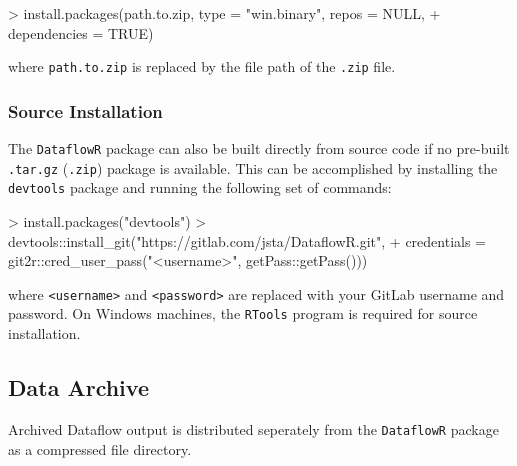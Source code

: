 \documentclass[12pt]{article}
\begin{document}
\begin{Schunk}
\begin{Sinput}
> install.packages(path.to.zip, type = "win.binary", repos = NULL,
+                  dependencies = TRUE)
\end{Sinput}
\end{Schunk}

where \texttt{path.to.zip} is replaced by the file path of the \texttt{.zip} file.

\subsubsection{Source Installation}

The \texttt{DataflowR} package can also be built directly from source code if no pre-built \texttt{.tar.gz} (\texttt{.zip}) package is available. This can be accomplished by installing the \texttt{devtools} package and running the following set of commands:

\begin{Schunk}
\begin{Sinput}
> install.packages("devtools")
> devtools::install_git("https://gitlab.com/jsta/DataflowR.git",
+   credentials = git2r::cred_user_pass("<username>", getPass::getPass()))
\end{Sinput}
\end{Schunk}

where \texttt{<username>} and \texttt{<password>} are replaced with your GitLab username and password. On Windows machines, the \texttt{RTools} program is required for source installation.

\subsection{Data Archive}

Archived Dataflow output is distributed seperately from the \texttt{DataflowR} package as a compressed file directory. 
\end{document}
